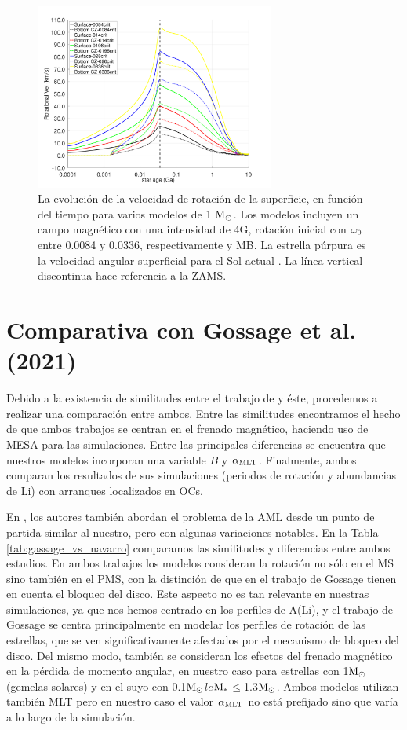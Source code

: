 \begin{figure}
	\centering
	\includegraphics[width=0.7\textwidth]{img/paper2/rot_vel_var_vel_4_0g4.pdf}
	\caption{La evolución de la velocidad de rotación de la superficie, en función del tiempo para varios modelos de 1 $\mathrm{M}_\odot$. Los modelos incluyen un campo magnético con una intensidad de 4G, rotación inicial con $\omega_{\mathrm{0}}$ entre 0.0084 y 0.0336, respectivamente y MB. La estrella púrpura es la velocidad angular superficial para el Sol actual \cite{Gill2012}. La línea vertical discontinua hace referencia a la ZAMS.}
	\label{fig:rot_vel_var_vel_4_0g4}
\end{figure}

\section{Comparativa con Gossage et al. (2021)}
Debido a la existencia de similitudes entre el trabajo de \cite{Gossage2021} y éste, procedemos a realizar una comparación entre ambos. Entre las similitudes encontramos el hecho de que ambos trabajos se centran en el frenado magnético, haciendo uso de MESA para las simulaciones. Entre las principales diferencias se encuentra que nuestros modelos incorporan una variable $B$ y $\alpha_{\mathrm{MLT}}$. Finalmente, ambos comparan los resultados de sus simulaciones (periodos de rotación y abundancias de Li) con arranques localizados en OCs.\par

En \cite{Gossage2021}, los autores también abordan el problema de la AML desde un punto de partida similar al nuestro, pero con algunas variaciones notables. En la Tabla \ref{tab:gassage_vs_navarro} comparamos las similitudes y diferencias entre ambos estudios. En ambos trabajos los modelos consideran la rotación no sólo en el MS sino también en el PMS, con la distinción de que en el trabajo de Gossage tienen en cuenta el bloqueo del disco. Este aspecto no es tan relevante en nuestras simulaciones, ya que nos hemos centrado en los perfiles de A(Li), y el trabajo de Gossage se centra principalmente en modelar los perfiles de rotación de las estrellas, que se ven significativamente afectados por el mecanismo de bloqueo del disco. Del mismo modo, también se consideran los efectos del frenado magnético en la pérdida de momento angular, en nuestro caso para estrellas con 1$\mathrm{M}_\odot$ (gemelas solares) y en el suyo con 0.1$\mathrm{M}_\odot$$le$$\mathrm{M}_*$$\le$1.3$\mathrm{M}_\odot$. Ambos modelos utilizan también MLT pero en nuestro caso el valor $\alpha_{\mathrm{MLT}}$ no está prefijado sino que varía a lo largo de la simulación.\par

